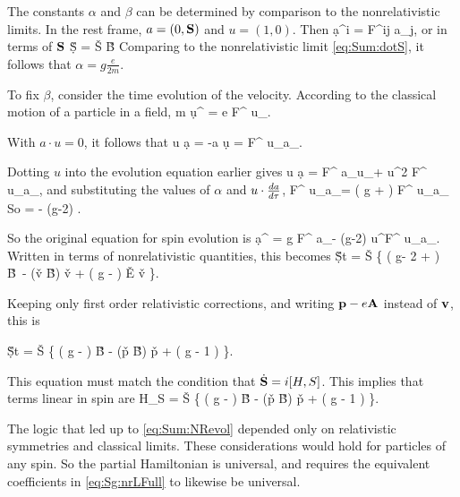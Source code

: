 The constants $\alpha$ and $\beta$ can be determined by comparison to the nonrelativistic limits.  In the rest frame, $a = (0, \mathbf{S})$ and $u=(1, 0)$.  Then 
\beq
	\d{a^i}{\tau} = \alpha F^{ij} a_j,
\eeq
or in terms of $\mathbf{S}$
\beq
	\d{\v{S}}{\tau} = \alpha \v{S} \times \v{B}
\eeq
Comparing to the nonrelativistic limit \eqref{eq:Sum:dotS}, it follows that $\alpha = g \frac{e}{2m}$.  

To fix $\beta$, consider the time evolution of the velocity.  According to the classical motion of a particle in a field, 
\beq
	m \d{u^\mu}{\tau} = e F^{\mu\nu} u_\nu.
\eeq

With $a \cdot u=0$, it follows that
\beq
	u \cdot \d{a}{\tau} = -a \cdot \d{u}{\tau}
		= F^{\mu\nu} u_\mu a_\nu.
\eeq

Dotting $u$ into the evolution equation earlier gives
\beq
	u \cdot \d{a}{\tau}  = \alpha F^{\mu\nu} a_\nu u_\mu + \beta u^2 F^{\mu\lambda} u_\mu a_\lambda,
\eeq
and substituting the values of $\alpha$ and $u \cdot \frac{d a}{d \tau}$,
\beq
	 F^{\mu\nu} u_\mu a_\nu	=	\left( g  + \beta \right)  F^{\mu \nu} u_\mu a_\nu 
\eeq
So 
\beq
	\beta = - (g-2) .
\eeq 

So the original equation for spin evolution is
\beq
\d{a^\mu}{\tau} = 
		g  F^{\mu\nu} a_\nu - (g-2)  u^\nu F^{\mu \lambda} u_\mu a_\lambda.
\eeq
Written in terms of nonrelativistic quantities, this becomes
\beq
	\d{\v{S}}{t} =
		 \v{S} \times \left\{ 
			\left( g- 2 + \right ) \v{B}\
			-  (\v{v} \cdot \v{B}) \v{v} 
			+ \left( g -  \right ) \v{E} \times \v{v}
		\right \}.
\eeq

Keeping only first order relativistic corrections, and writing $\mathbf{p}-e\mathbf{A}$ instead of $\mathbf{v}$, this is

\beq \label{eq:Sum:NRevol}
		\d{\v{S}}{t} =
		 \v{S} \times \left\{ 
			\left( g -   \right ) \v{B}
			-  (\v{p} \cdot \v{B}) \v{p} 
			+ \left( g - 1 \right ) 
		\right \}.
\eeq

This equation must match the condition that $\dot{\mathbf{S}} = i[H, S]$.  This implies that terms linear in spin are
\beq	H_S =
		 \v{S} \cdot \left\{ 
			\left( g -   \right ) \v{B}
			-  (\v{p} \cdot \v{B}) \v{p} 
			+ \left( g - 1 \right ) 
		\right \}.
\eeq 

The logic that led up to \eqref{eq:Sum:NRevol} depended only on relativistic symmetries and classical limits.  These considerations would hold for particles of any spin.  So the partial Hamiltonian is universal, and requires the equivalent coefficients in \eqref{eq:Sg:nrLFull} to likewise be universal.
